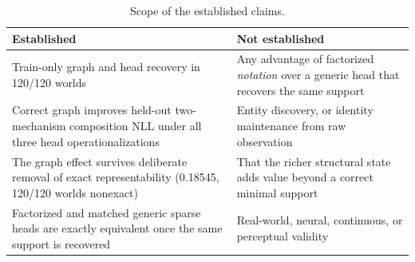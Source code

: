 \begin{table}[H]
\centering
\small
\caption{Scope of the established claims.}
\label{tab:claim-scope}
\begin{tabular}{@{}p{}p{}@{}}
\toprule
Established & Not established \\
\midrule
Train-only graph and head recovery in 120/120 worlds & Any advantage of factorized \emph{notation} over a generic head that recovers the same support \\
Correct graph improves held-out two-mechanism composition NLL under all three head operationalizations & Entity discovery, or identity maintenance from raw observation \\
The graph effect survives deliberate removal of exact representability (0.18545, 120/120 worlds nonexact) & That the richer structural state adds value beyond a correct minimal support \\
Factorized and matched generic sparse heads are exactly equivalent once the same support is recovered & Real-world, neural, continuous, or perceptual validity \\
\bottomrule
\end{tabular}
\end{table}
